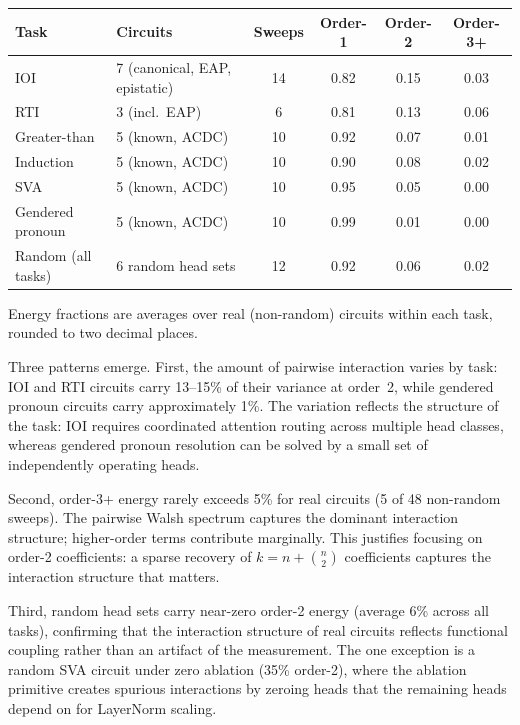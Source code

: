 \documentclass{article}
\begin{document}
\medskip

{\small
\begin{tabular}{llcccc}
\toprule
Task & Circuits & Sweeps & Order-1 & Order-2 & Order-3+ \\
\midrule
IOI            & 7 (canonical, EAP, epistatic) & 14 & 0.82 & 0.15 & 0.03 \\
RTI            & 3 (incl.\ EAP)               &  6 & 0.81 & 0.13 & 0.06 \\
Greater-than   & 5 (known, ACDC)               & 10 & 0.92 & 0.07 & 0.01 \\
Induction      & 5 (known, ACDC)               & 10 & 0.90 & 0.08 & 0.02 \\
SVA            & 5 (known, ACDC)               & 10 & 0.95 & 0.05 & 0.00 \\
Gendered pronoun & 5 (known, ACDC)             & 10 & 0.99 & 0.01 & 0.00 \\
\midrule
Random (all tasks) & 6 random head sets        & 12 & 0.92 & 0.06 & 0.02 \\
\bottomrule
\end{tabular}
}

\medskip

\noindent Energy fractions are averages over real (non-random) circuits
within each task, rounded to two decimal places.

Three patterns emerge. First, the amount of pairwise interaction varies
by task: IOI and RTI circuits carry 13--15\% of their variance at
order~2, while gendered pronoun circuits carry approximately 1\%. The
variation reflects the structure of the task: IOI requires coordinated
attention routing across multiple head classes, whereas gendered pronoun
resolution can be solved by a small set of independently operating heads.

Second, order-3+ energy rarely exceeds 5\% for real circuits (5 of 48
non-random sweeps). The pairwise Walsh spectrum captures the dominant
interaction structure; higher-order terms contribute marginally. This
justifies focusing on order-2 coefficients: a sparse recovery of
$k = n + \binom{n}{2}$ coefficients captures the interaction structure
that matters.

Third, random head sets carry near-zero order-2 energy (average 6\%
across all tasks), confirming that the interaction structure of real
circuits reflects functional coupling rather than an artifact of the
measurement. The one exception is a random SVA circuit under zero
ablation (35\% order-2), where the ablation primitive creates spurious
interactions by zeroing heads that the remaining heads depend on for
LayerNorm scaling.
\end{document}
